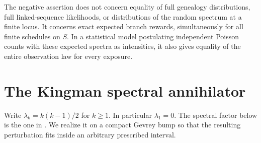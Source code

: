 \documentclass[11pt]{article}
\theoremstyle{definition}
\theoremstyle{remark}
\numberwithin{equation}{section}
\begin{document}
The negative assertion does not concern equality of full genealogy
distributions, full linked-sequence likelihoods, or distributions of
the random spectrum at a finite locus. It concerns exact expected
branch rewards, simultaneously for all finite schedules on $S$.
In a statistical model postulating independent Poisson counts with
these expected spectra as intensities, it also gives equality of the
entire observation law for every exposure.

\section{The Kingman spectral annihilator}
\label{sec:kingman}

Write $\lambda_k=k(k-1)/2$ for $k\ge1$. In particular $\lambda_1=0$.
The spectral factor below is the one in \cite[equation (21)]{MFP}.
We realize it on a compact Gevrey bump so that the resulting perturbation
fits inside an arbitrary prescribed interval.
\end{document}
